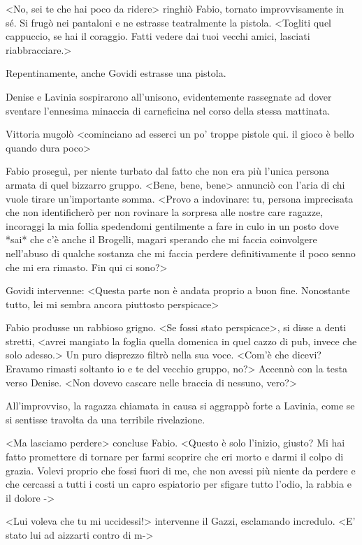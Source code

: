 <No, sei te che hai poco da ridere> ringhiò Fabio, tornato improvvisamente in sé. Si frugò nei pantaloni e ne estrasse teatralmente la pistola. <Togliti quel cappuccio, se hai il coraggio. Fatti vedere dai tuoi vecchi amici, lasciati riabbracciare.>

Repentinamente, anche Govidi estrasse una pistola.

Denise e Lavinia sospirarono all'unisono, evidentemente rassegnate ad dover sventare l'ennesima minaccia di carneficina nel corso della stessa mattinata. 

Vittoria mugolò <cominciano ad esserci un po' troppe pistole qui. il gioco è bello quando dura poco>

Fabio proseguì, per niente turbato dal fatto che non era più l'unica persona armata di quel bizzarro gruppo. <Bene, bene, bene> annunciò con l'aria di chi vuole tirare un'importante somma. <Provo a indovinare: tu, persona imprecisata che non identificherò per non rovinare la sorpresa alle nostre care ragazze, incoraggi la mia follia spedendomi gentilmente a fare in culo in un posto dove *sai* che c'è anche il Brogelli, magari sperando che mi faccia coinvolgere nell'abuso di qualche sostanza che mi faccia perdere definitivamente il poco senno che mi era rimasto. Fin qui ci sono?>

Govidi intervenne: <Questa parte non è andata proprio a buon fine. Nonostante tutto, lei mi sembra ancora piuttosto perspicace>

Fabio produsse un rabbioso grigno. <Se fossi stato perspicace>, si disse a denti stretti, <avrei mangiato la foglia quella domenica in quel cazzo di pub, invece che solo adesso.> Un puro disprezzo filtrò nella sua voce. <Com'è che dicevi? Eravamo rimasti soltanto io e te del vecchio gruppo, no?> Accennò con la testa verso Denise. <Non dovevo cascare nelle braccia di nessuno, vero?>

All'improvviso, la ragazza chiamata in causa si aggrappò forte a Lavinia, come se si sentisse travolta da una terribile rivelazione.

<Ma lasciamo perdere> concluse Fabio. <Questo è solo l'inizio, giusto? Mi hai fatto promettere di tornare per farmi scoprire che eri morto e darmi il colpo di grazia. Volevi proprio che fossi fuori di me, che non avessi più niente da perdere e che cercassi a tutti i costi un capro espiatorio per sfigare tutto l'odio, la rabbia e il dolore ->

<Lui voleva che tu mi uccidessi!> intervenne il Gazzi, esclamando incredulo. <E' stato lui ad aizzarti contro di m->


